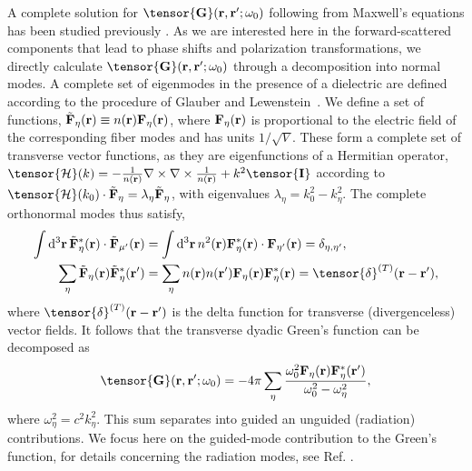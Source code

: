 \documentclass[preprint,aps,pra,onecolumn]{revtex4-1} %
\newcommand{\fidx}{\eta}
\begin{document}
A complete solution for $\tensor{\mathbf{G}}(\br ,\br' ; \omega_0)$ following from Maxwell's equations 
has been studied previously \cite{sakoda_optical_1996,sondergaard_general_2001}.  As we are interested here in the forward-scattered components that lead to phase shifts and polarization transformations, we directly calculate $\tensor{\mathbf{G}}(\br ,\br' ; \omega_0)$ through a decomposition into normal modes.  A complete set of eigenmodes in the presence of a dielectric are defined according to the procedure of Glauber and Lewenstein~\cite{glauber_quantum_1991}.  We define a set of functions, $\tilde{\mathbf{F}}_\fidx(\br) \equiv n(\br) \mathbf{F}_\fidx (\br)$, where $\mathbf{F}_\fidx (\br)$ is proportional to the electric field of the corresponding fiber modes and has units $1/\sqrt{V}$.  These form a complete set of transverse vector functions, as they are eigenfunctions of a Hermitian operator, 
$\tensor{\mathcal{H}}(k) = -\frac{1}{n(\br)} \nabla\times\nabla\times \frac{1}{n(\br)} + k^2 \tensor{\mathbf{I}}$ according to  $\tensor{\mathcal{H}}(k_0) \cdot \tilde{\mathbf{F}}_\fidx = \lambda_\fidx \tilde{\mathbf{F}}_\fidx$, with eigenvalues $\lambda_\fidx=k_0^2-k_\fidx^2$. The complete orthonormal modes thus satisfy,
\begin{align}
\int \mathrm{d}^3\br \, \tilde{\mathbf{F}}_\fidx^* (\br)\cdot \tilde{\mathbf{F}}_{\mu'}(\br)  &= \int \mathrm{d}^3\br \, n^2(\br) 
\mathbf{F}_\fidx^* (\br)\cdot  \mathbf{F}_{\fidx'}(\br) =\delta_{\fidx, \fidx'},\label{eq:orthutrans}
\\
\sum_\fidx \tilde{\mathbf{F}}_\fidx (\br) \tilde{\mathbf{F}}_\fidx^*(\br') &= \sum_\fidx n(\br)n(\br') 
\mathbf{F}_\fidx  (\br) \mathbf{F}_\fidx^*(\br) =\tensor{\delta}^{(T)}(\br-\br'), 
\end{align}
where $\tensor{\delta}^{(T)}(\br-\br')$ is the  delta function for transverse (divergenceless) vector 
fields.  It follows that the transverse dyadic Green's function can be decomposed as~\cite{sondergaard_general_2001}
\begin{equation}
\tensor{\mathbf{G}}(\br,\br'; \omega_0) = -4\pi \sum_{\fidx} \frac{\omega_0^2\mathbf{F}_\fidx (\br) 
\mathbf{F}^*_\fidx (\br')}{\omega_0^2-\omega_\fidx^2},
\end{equation}
where $\omega_\fidx^2 = c^2 k_\fidx^2$.  This sum separates into guided an unguided (radiation) contributions. We focus here on the guided-mode contribution to the Green's function, for details concerning the radiation modes, see Ref. \cite{sondergaard_general_2001,le_kien_spontaneous_2005, le_kien_anisotropy_2014} .
\end{document}
